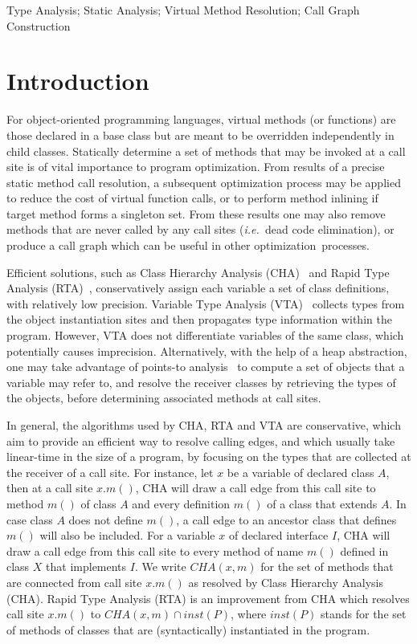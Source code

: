 \documentclass{fac}
\newcommand\ie{\textit{i.e.\ }}
\begin{document}
\begin{keywords}
Type Analysis; Static Analysis; Virtual Method Resolution; Call Graph Construction
\end{keywords}

\section{Introduction}\label{sec:introduction}
For object-oriented programming languages, virtual methods (or functions) are those declared in a base class but are meant to be overridden independently in child classes. Statically determine a set of methods that may be invoked at a call site is of vital importance to program optimization. From results of a precise static method call resolution, a subsequent optimization process may be applied to reduce the cost of virtual function calls, or to perform method inlining if target method forms a singleton set. From these results one may also remove methods that are never called by any call sites (\ie dead code elimination), or produce a call graph which can be useful in other optimization~processes.

Efficient solutions, such as Class Hierarchy Analysis (CHA)~\cite{Dean1995,Fernandez1995} and Rapid Type Analysis (RTA)~\cite{Bacon1996}, conservatively assign each variable a set of class definitions, with relatively low precision. Variable Type Analysis (VTA)~\cite{Sundaresan2000} collects types from the object instantiation sites and then propagates type information within the program. However, VTA does not differentiate variables of the same class, which potentially causes imprecision. Alternatively, with the help of a heap abstraction, one may take advantage of points-to analysis~\cite{andersen94} to compute a set of objects that a variable may refer to, and resolve the receiver classes by retrieving the types of the objects, before determining associated methods at call sites.

In general, the algorithms used by CHA, RTA and VTA are conservative, which aim to provide an efficient way to resolve calling edges, and which usually take linear-time in the size of a program, by focusing on the types that are collected at the receiver of a call site. For instance, let $x$ be a variable of declared class $A$, then at a call site $x.m()$, CHA will draw a call edge from this call site to method $m()$ of class $A$ and every definition $m()$ of a class that extends $A$. In case class $A$ does not define $m()$, a call edge to an ancestor class that defines $m()$ will also be included. For a variable $x$ of declared interface $I$, CHA will draw a call edge from this call site to every method of name $m()$ defined in class $X$ that implements $I$.
We write $CHA(x,m)$ for the set of methods that are connected from call site $x.m()$ as resolved by  Class Hierarchy Analysis (CHA).
Rapid Type Analysis (RTA) is an improvement from CHA which resolves call site $x.m()$ to $CHA(x,m)\cap inst(P)$, where $inst(P)$ stands for the set of methods of classes that are (syntactically) instantiated in the program.
\end{document}
